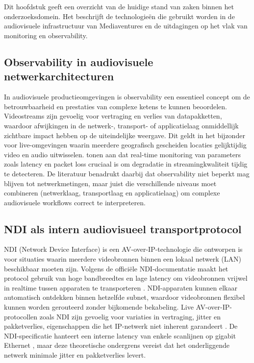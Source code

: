 \chapter{}%
\label{ch:stand-van-zaken}

Dit hoofdstuk geeft een overzicht van de huidige stand van zaken binnen het onderzoeksdomein. Het beschrijft de technologieën die gebruikt worden in de audiovisuele infrastructuur van Mediaventures en de uitdagingen op het vlak van monitoring en observability.

\section{Observability in audiovisuele netwerkarchitecturen}
\label{sec:observability-av}

In audiovisuele productieomgevingen is observability een essentieel concept om de betrouwbaarheid en prestaties van complexe ketens te kunnen beoordelen. Videostreams zijn gevoelig voor vertraging en verlies van datapakketten, waardoor afwijkingen in de netwerk-, transport- of applicatielaag onmiddellijk zichtbare impact hebben op de uiteindelijke weergave. Dit geldt in het bijzonder voor live-omgevingen waarin meerdere geografisch gescheiden locaties gelijktijdig video en audio uitwisselen. \textcite{Tommasi2021} tonen aan dat real-time monitoring van parameters zoals latency en packet loss cruciaal is om degradatie in streamingkwaliteit tijdig te detecteren. De literatuur benadrukt daarbij dat observability niet beperkt mag blijven tot netwerkmetingen, maar juist die verschillende niveaus moet combineren (netwerklaag, transportlaag en applicatielaag) om complexe audiovisuele workflows correct te interpreteren.

\section{NDI als intern audiovisueel transportprotocol}
\label{sec:ndi}

NDI (Network Device Interface) is een AV-over-IP-technologie die ontworpen is voor situaties waarin meerdere videobronnen binnen een lokaal netwerk (LAN) beschikbaar moeten zijn. Volgens de officiële NDI-documentatie maakt het protocol gebruik van hoge bandbreedtes en lage latency om videobronnen vrijwel in realtime tussen apparaten te transporteren \autocite{NewTek2022}. NDI-apparaten kunnen elkaar automatisch ontdekken binnen hetzelfde subnet, waardoor videobronnen flexibel kunnen worden gerouteerd zonder bijkomende bekabeling. Live AV-over-IP-protocollen zoals NDI zijn gevoelig voor variaties in vertraging, jitter en pakketverlies, eigenschappen die het IP-netwerk niet inherent garandeert \autocite{Santos2021}. De NDI-specificatie hanteert een interne latency van enkele scanlijnen op gigabit Ethernet \autocite{NDIWhitePaper2023}, maar deze theoretische ondergrens vereist dat het onderliggende netwerk minimale jitter en pakketverlies levert.

